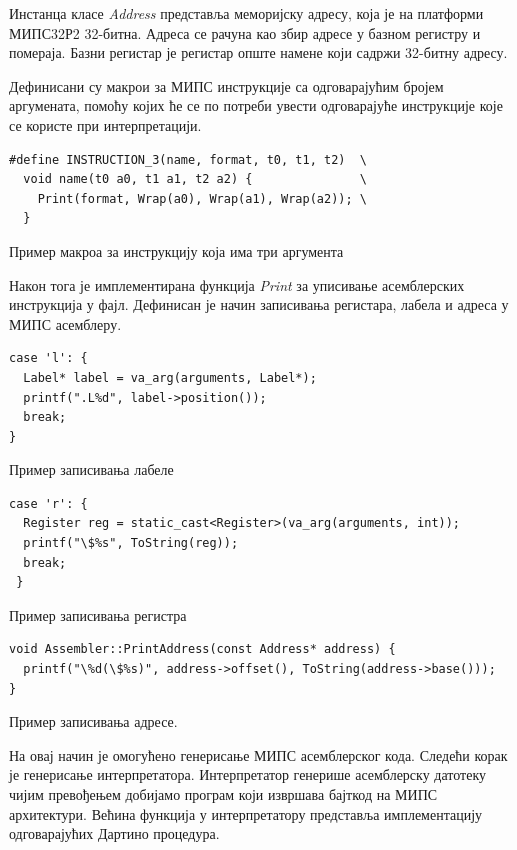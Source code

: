 \documentclass[12pt,oneside]{memoir}
\begin{document}
Инстанца класе \textit{Address} представља меморијску адресу, која је на платформи МИПС32Р2 32-битна. Адреса се рачуна као збир адресе у базном регистру и помераја. Базни регистар је регистар опште намене који садржи 32-битну адресу. 

Дефинисани су макрои за МИПС инструкције са одговарајућим бројем аргумената, помоћу којих ће се по потреби увести одговарајуће инструкције које се користе при интерпретацији.\\

\begin{verbatim}
#define INSTRUCTION_3(name, format, t0, t1, t2)  \
  void name(t0 a0, t1 a1, t2 a2) {               \
    Print(format, Wrap(a0), Wrap(a1), Wrap(a2)); \
  }
\end{verbatim}

Пример макроа за инструкцију која има три аргумента

Након тога је имплементирана функција \textit{Print} за уписивање асемблерских инструкција у фајл. Дефинисан је начин записивања регистара, лабела и адреса у МИПС асемблеру.\\

\begin{verbatim}
case 'l': {
  Label* label = va_arg(arguments, Label*);
  printf(".L%d", label->position());
  break;
}
\end{verbatim}

Пример записивања лабеле\\

\begin{verbatim}
case 'r': {
  Register reg = static_cast<Register>(va_arg(arguments, int));
  printf("\$%s", ToString(reg));
  break;
 }
\end{verbatim}

Пример записивања регистра\\

\begin{verbatim}
void Assembler::PrintAddress(const Address* address) {
  printf("\%d(\$%s)", address->offset(), ToString(address->base()));
}
\end{verbatim}

Пример записивања адресе.

На овај начин је омогућено генерисање МИПС асемблерског кода. Следећи корак је генерисање интерпретатора. Интерпретатор генерише асемблерску датотеку чијим превођењем добијамо програм који извршава бајткод на МИПС архитектури. Већина функција у интерпретатору представља имплементацију одговарајућих Дартино процедура.
\end{document}
